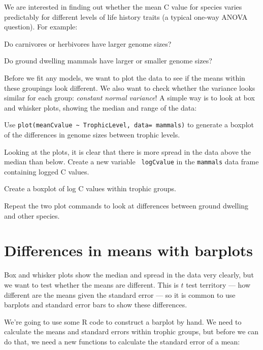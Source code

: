 We are interested in finding out whether the mean C value for species 
varies predictably for different levels of life history traits (a 
typical one-way ANOVA question). For example: 

\begin{compactitem}
\item Do carnivores or herbivores have larger genome sizes?
\item Do ground dwelling mammals have larger or smaller genome sizes?
\end{compactitem}

Before we fit any models, we want to plot the data to see if the means 
within these groupings look different. We also want to check whether 
the variance looks similar for each group: {\it constant normal 
variance}! A simple way is to look at box and whisker plots, showing 
the median and range of the data:

\begin{compactitem}[$\quad\star$]
	\item Use {\tt plot(meanCvalue \textasciitilde{} TrophicLevel, 
	data= mammals)} to generate a boxplot of the differences in genome 
	sizes between trophic levels.
	\item Looking at the plots, it is clear that there is more spread in 
	the data above the median than below. Create a new variable {\tt 
	logCvalue} in the {\tt mammals} data frame containing logged C 
	values.
	\item Create a boxplot of log C values within trophic groups.
	\item Repeat the two plot commands to look at differences between 
	ground dwelling and other species.
\end{compactitem}

\section{Differences in means with barplots}

Box and whisker plots show the median and spread in the data very 
clearly, but we want to test whether the means are different. This is 
$t$ test territory --- how different are the means given the standard 
error --- so it is common to use barplots and standard error bars to 
show these differences.

We're going to use some R code to construct a barplot by hand. We need 
to calculate the means and standard errors within trophic groups, but 
before we can do that, we need a new functions to calculate the 
standard error of a mean:

